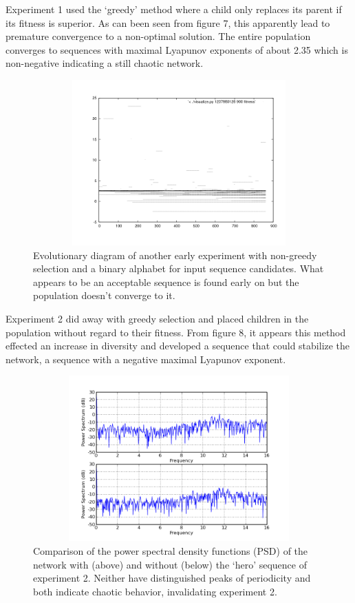 \documentclass[12pt]{article}
\begin{document}
Experiment 1 used the `greedy' method where a child only replaces its parent if
its fitness is superior.  As can been seen from figure 7,
this apparently lead to premature convergence to a non-optimal solution.
The entire population converges to sequences with maximal Lyapunov exponents
of about 2.35 which is non-negative indicating a still chaotic network.

\begin{figure}[htb]
\begin{center}
\includegraphics[height=2.5in,width=4.5in]{images/early_exp_non_greedy.png}
\caption{Evolutionary diagram of another early experiment with non-greedy selection and a binary alphabet for input sequence candidates.  What appears to be an acceptable sequence is found early on but the population doesn't converge to it.}
\end{center}
\end{figure}

Experiment 2 did away with greedy selection and placed children in the
population without regard to their fitness.  From figure 8,
it appears this method effected an increase in diversity and developed
a sequence that could stabilize the network, a sequence with a negative
maximal Lyapunov exponent.

\begin{figure}[htb]
\begin{center}
\includegraphics[height=2.5in,width=4.5in]{images/big_run_psd_small_amp.png}
\caption{Comparison of the power spectral density functions (PSD) of the
network with (above) and without (below) the `hero' sequence of experiment 2.  Neither have distinguished peaks of periodicity and both indicate chaotic behavior, invalidating experiment 2.}
\end{center}
\end{figure}
\end{document}
